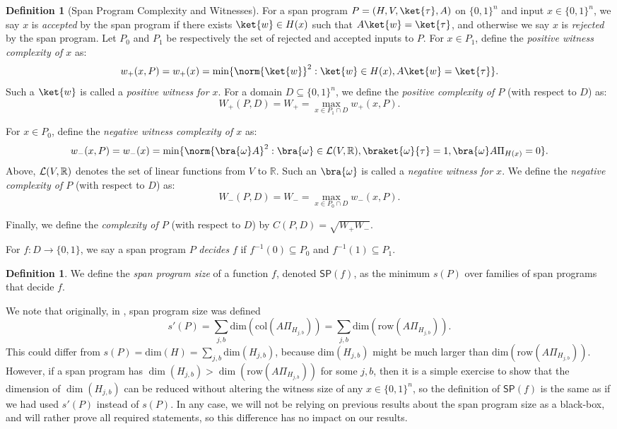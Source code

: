 \documentclass[11pt]{article}
\numberwithin{equation}{section}
\theoremstyle{definition}
\newtheorem{definition}[theorem]{Definition}
\theoremstyle{plain}
\newcommand{\R}{\mathbb R}
\begin{document}
\begin{definition}[Span Program Complexity and Witnesses]\label{def:witness}
For a span program $P=(H,V,\ket{\tau},A)$ on $\{0,1\}^n$ and input $x\in\{0,1\}^n$, 
we say $x$ is \emph{accepted} by the span program if there exists $\ket{w}\in H(x)$ such that $A\ket{w}=\ket{\tau}$, and otherwise we say $x$ is \emph{rejected} by the span program. Let $P_0$ and $P_1$ be respectively the set of rejected and accepted inputs to $P$. For $x\in P_1$, define the \emph{positive witness complexity of $x$} as:
$$w_+(x,P)=w_+(x)=\min\{\norm{\ket{w}}^2:\ket{w}\in H(x), A\ket{w}=\ket{\tau}\}.$$
Such a $\ket{w}$ is called a \emph{positive witness for $x$}. For a domain $D\subseteq\{0,1\}^n$, we define the \emph{positive complexity of $P$} (with respect to $D$) as:
$$W_+(P,D)=W_+=\max_{x\in P_1\cap D}w_+(x,P).$$

For $x\in P_0$, define the \emph{negative witness complexity of $x$} as:
$$w_-(x,P)=w_-(x)=\min\{\norm{\bra{\omega} A}^2:\bra{\omega}\in{\cal L}(V,\R), \braket{\omega }{\tau}=1,\bra{\omega} A\Pi_{H(x)}=0\}.$$
Above, ${\cal L}(V,\R)$ denotes the set of linear functions from $V$ to $\R$.
Such an $\bra{\omega}$ is called a \emph{negative witness for $x$}. We define the \emph{negative complexity of $P$} (with respect to $D$) as:
$$W_-(P,D)=W_-=\max_{x\in P_0\cap D}w_-(x,P).$$

Finally, we define the \emph{complexity of $P$} (with respect to $D$) by $C(P,D)=\sqrt{W_+W_-}$. 
\end{definition}

For $f:D\rightarrow\{0,1\}$, we say a span program $P$ \emph{decides} $f$ if $f^{-1}(0)\subseteq P_0$ and $f^{-1}(1)\subseteq P_1$. 

\begin{definition}\label{def:SP}
We define the \emph{span program size} of a function $f$, denoted $\mathsf{SP}(f)$, as the minimum $s(P)$ over families of span programs that decide $f$. 
\end{definition}

We note that originally, in \cite{KW93}, span program size was defined 
$$s'(P)=\sum_{j,b}\mathrm{dim}(\mathrm{col}(A\Pi_{H_{j,b}}))=\sum_{j,b}\mathrm{dim}(\mathrm{row}(A\Pi_{H_{j,b}})).$$ 
This could differ from $s(P)=\mathrm{dim}(H)=\sum_{j,b}\mathrm{dim}(H_{j,b})$, because 
$\mathrm{dim}(H_{j,b})$ might be much larger than $\mathrm{dim}(\mathrm{row}(A\Pi_{H_{j,b}}))$. However, if a span program has $\dim(H_{j,b})>\dim(\mathrm{row}(A\Pi_{H_{j,b}}))$ for some $j,b$, then it is a simple exercise to show that the dimension of $\dim(H_{j,b})$ can be reduced without altering the witness size of any $x\in\{0,1\}^n$, so the definition of $\mathsf{SP}(f)$ is the same as if %
we had   %
used $s'(P)$ instead of $s(P)$. In any case, we will not be relying on previous results about the span program size as a black-box, and will rather prove all required statements, so this difference has no impact on our results. 
\end{document}
